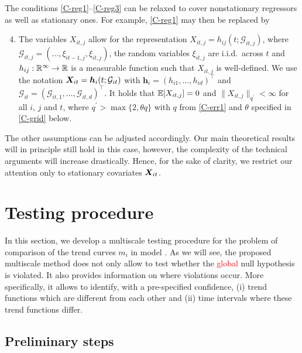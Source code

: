 \documentclass[a4paper,12pt]{article}
\makeatletter
\renewcommand{\eqref}[1]{\tagform@{\ref{#1}}}
\makeatother
\begin{document}
\begin{remark}
The conditions \ref{C-reg1}--\ref{C-reg3} can be relaxed to cover nonstationary regressors as well as stationary ones. For example, \ref{C-reg1} may then be replaced by
{\color{red}
\begin{enumerate}[label=(C\arabic*$^\ast$),leftmargin=1.15cm]
\setcounter{enumi}{3}
\item \label{C-reg1-star} The variables $X_{it, j}$ allow for the representation $X_{it, j} = h_{ij}(t; \mathcal{G}_{it, j})$, where $\mathcal{G}_{it, j} = (\ldots, \xi_{it-1,j}, \xi_{it, j})$, the random variables $\xi_{it, j}$ are i.i.d.\ across $t$ and $h_{ij}: \mathbb{R}^\infty \rightarrow \mathbb{R}$ is a measurable function such that $X_{it, j}$ is well-defined. We use the notation $\boldsymbol{X}_{it} = \boldsymbol{h}_{i}(t; \mathcal{G}_{it})$ with $\boldsymbol{h}_i = (h_{i1}, \ldots, h_{id})^\top$ and $\mathcal{G}_{it} = (\mathcal{G}_{it,1}, \ldots, \mathcal{G}_{it, d})^\top$. It holds that $\mathbb{E} [X_{it, j}]=0$ and $\| X_{it, j} \|_{q^\prime} <\infty$ for all $i$, $j$ and $t$, where $q^\prime > \max \{ 2, \theta q \}$ with $q$ from \ref{C-err1} and $\theta$ specified in \ref{C-grid} below.
\end{enumerate}}
The other assumptions can be adjusted accordingly. Our main theoretical results will in principle still hold in this case, however, the complexity of the technical arguments will increase drastically. Hence, for the sake of clarity, we restrict our attention only to stationary  covariates $\boldsymbol{X}_{it}$. 
\end{remark}


\section{Testing procedure}\label{sec:test}

In this section, we develop a multiscale testing procedure for the problem of comparison of the trend curves $m_i$ in model \eqref{eq:model_full}.  As we will see, the proposed multiscale method does not only allow to test whether the \textcolor{red}{global} null hypothesis is violated. It also provides information on where violations occur. More specifically, it allows to identify, with a pre-specified confidence, (i) trend functions which are different from each other and (ii) time intervals where these trend functions differ.

\subsection{Preliminary steps}\label{subsec:test:prep}
\end{document}
